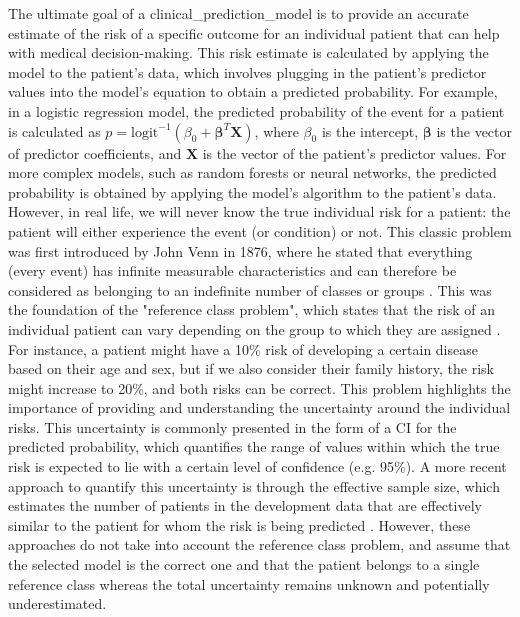 The ultimate goal of a \gls{clinical_prediction_model} is to provide an accurate estimate of the risk of a specific outcome for an individual patient that can help with medical decision-making. This risk estimate is calculated by applying the model to the patient's data, which involves plugging in the patient's predictor values into the model's equation to obtain a predicted probability. For example, in a logistic regression model, the predicted probability of the event for a patient is calculated as $p = \text{logit}^{-1}(\beta_0 + \boldsymbol{\beta}^T \mathbf{X})$, where $\beta_0$ is the intercept, $\boldsymbol{\beta}$ is the vector of predictor coefficients, and $\mathbf{X}$ is the vector of the patient's predictor values. For more complex models, such as random forests or neural networks, the predicted probability is obtained by applying the model's algorithm to the patient's data. However, in real life, we will never know the true individual risk for a patient: the patient will either experience the event (or condition) or not. This classic problem was first introduced by John Venn in 1876, where he stated that everything (every event) has infinite measurable characteristics and can therefore be considered as belonging to an indefinite number of classes or groups \cite{Venn1876}. This was the foundation of the "reference class problem", which states that the risk of an individual patient can vary depending on the group to which they are assigned \cite{Reichenbach1949}. For instance, a patient might have a 10\% risk of developing a certain disease based on their age and sex, but if we also consider their family history, the risk might increase to 20\%, and both risks can be correct. This problem highlights the importance of providing and understanding the uncertainty around the individual risks. This uncertainty is commonly presented in the form of a \gls{CI} for the predicted probability, which quantifies the range of values within which the true risk is expected to lie with a certain level of confidence (e.g. 95\%). A more recent approach to quantify this uncertainty is through the effective sample size, which estimates the number of patients in the development data that are effectively similar to the patient for whom the risk is being predicted \cite{thomassenEffectiveSampleSize2025}. However, these approaches do not take into account the reference class problem, and assume that the selected model is the correct one and that the patient belongs to a single reference class whereas the total uncertainty remains unknown and potentially underestimated. 

